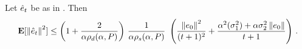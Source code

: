 \begin{theorem}\label{th:pdrate}
Let $\hat{e}_t$ be as in . %
Then
\begin{align}
\mathbf{E}[\left\| \hat{e}_t\right\|^2]
\leq \left(1+\frac2{\alpha\rho_d(\alpha,P)}\right)\, \frac1{\alpha\rho_s(\alpha,P)}\, \,
\left(\frac{\left\| e_0\right\|^2}{(t+1)^2}+ \frac{\alpha^2(\sigma_1^2)+\alpha \sigma_2^2\left\| e_0\right\|}{t+1} \right)\,.
\end{align}
\end{theorem}
